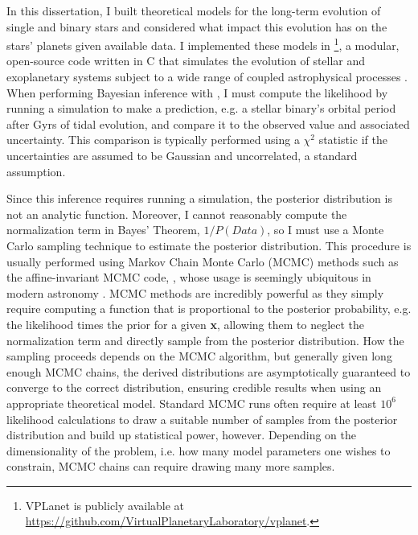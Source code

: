 In this dissertation, I built theoretical models for the long-term evolution of single and binary stars and considered what impact this evolution has on the stars' planets given available data. I implemented these models in \vplanet\footnote{VPLanet is publicly available
at \href{https://github.com/VirtualPlanetaryLaboratory/vplanet}{{https://github.com/VirtualPlanetaryLaboratory/vplanet}}.}, a modular, open-source code written in C that simulates the evolution of stellar and exoplanetary systems subject to a wide range of coupled astrophysical processes \citep{Barnes2019}. When performing Bayesian inference with \vplanet, I must compute the likelihood by running a simulation to make a prediction, e.g. a stellar binary's orbital period after Gyrs of tidal evolution, and compare it to the observed value and associated uncertainty. This comparison is typically performed using a $\chi^2$ statistic if the uncertainties are assumed to be Gaussian and uncorrelated, a standard assumption. 

Since this inference requires running a \vplanet simulation, the posterior distribution is not an analytic function. Moreover, I cannot reasonably compute the normalization term in Bayes' Theorem, $1/P(Data)$, so I must use a Monte Carlo sampling technique to estimate the posterior distribution. This procedure is usually performed using Markov Chain Monte Carlo (MCMC) methods such as the affine-invariant MCMC code, \emcee, whose usage is seemingly ubiquitous in modern astronomy \citep{ForemanMackey2013}. MCMC methods are incredibly powerful as they simply require computing a function that is proportional to the posterior probability, e.g. the likelihood times the prior for a given \textbf{x}, allowing them to neglect the normalization term and directly sample from the posterior distribution. How the sampling proceeds depends on the MCMC algorithm, but generally given long enough MCMC chains, the derived distributions are asymptotically guaranteed to converge to the correct distribution, ensuring credible results when using an appropriate theoretical model. Standard MCMC runs often require at least $10^6$ likelihood calculations to draw a suitable number of samples from the posterior distribution and build up statistical power, however. Depending on the dimensionality of the problem, i.e. how many model parameters one wishes to constrain, MCMC chains can require drawing many more samples.


